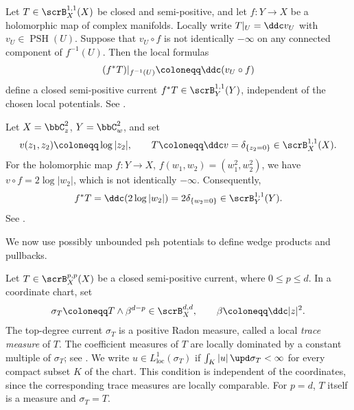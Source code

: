 \begin{construction}[label=\labelNFM{prop:pull-back-of-semipositive-11-current}, status=draft, tag=0000000]
	Let $T \in \scrB_X^{1,1}(X)$ be closed and semi-positive,
	and let $f:Y \to X$ be a holomorphic map of complex manifolds.
	Locally write $T|_U = \ddc v_U$ with $v_U \in \operatorname{PSH}(U)$.
	Suppose that $v_U \circ f$ is not identically $-\infty$ on any connected component of $f^{-1}(U)$.
	Then the local formulas
	\[ (f^*T)|_{f^{-1}(U)} \coloneqq \ddc(v_U \circ f) \]
	define a closed semi-positive current $f^*T \in \scrB_Y^{1,1}(Y)$, independent of the chosen local potentials.
  See \cite[Chapter~III, Proposition~1.19, and Chapter~I, Theorem~5.11]{Demailly-2012-ComplexAnalyticDifferential}.
\end{construction}

\begin{example}[label=\labelNFM{eg:pull-back-of-semipositive-11-currents}, status=draft, tag=0000000]
	Let $X = \bbC_z^2$, $Y = \bbC_w^2$, and set
	\[ v(z_1,z_2) \coloneqq \log|z_2|, \qquad T \coloneqq \ddc v = \delta_{\{z_2 = 0\}} \in \scrB_X^{1,1}(X). \]
	For the holomorphic map $f:Y \to X$, $f(w_1,w_2) = (w_1^2,w_2^2)$,
	we have $v \circ f = 2 \log|w_2|$, which is not identically $-\infty$.
	Consequently,
	\[ f^*T = \ddc(2 \log|w_2|) = 2 \delta_{\{w_2 = 0\}} \in \scrB_Y^{1,1}(Y). \]
	See \cite[Theorem~6.3.1 and Exercise~6.3.5]{Dinh-Sibony-2005-IntroductionTheoryCurrents}.
\end{example}

We now use possibly unbounded psh potentials to define wedge products and pullbacks.

\begin{construction}[label=\labelNFM{constr:products-and-pullbacks-of-currents}, status=draft, tag=0000000]
	Let $T \in \scrB_X^{p,p}(X)$ be a closed semi-positive current, where $0 \leq p \leq d$.
	In a coordinate chart, set
	\[ \sigma_T \coloneqq T \wedge \beta^{d-p} \in \scrB_X^{d,d}, \qquad \beta \coloneqq \ddc|z|^2. \]
	The top-degree current $\sigma_T$ is a positive Radon measure, called a local \emph{trace measure} of $T$.
	The coefficient measures of $T$ are locally dominated by a constant multiple of $\sigma_T$;
	see \cite[Chapter~III, \S 1.B, Proposition~1.14]{Demailly-2012-ComplexAnalyticDifferential}.
	We write $u \in L^1_{\mathrm{loc}}(\sigma_T)$ if $\int_K |u|\,\upd\sigma_T < \infty$ for every compact subset $K$ of the chart.
	This condition is independent of the coordinates, since the corresponding trace measures are locally comparable.
	For $p = d$, $T$ itself is a measure and $\sigma_T = T$.
\end{construction}

